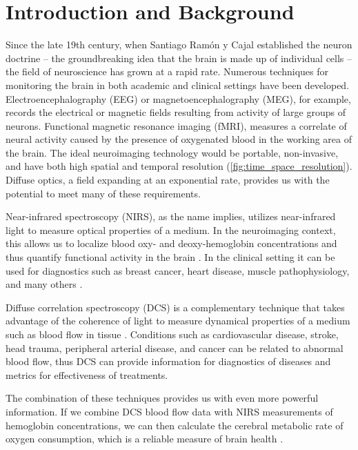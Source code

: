 \chapter{Introduction and Background} \label{sec:Chapter1}

Since the late 19th century, when Santiago Ram{\'o}n y Cajal established the neuron doctrine -- the groundbreaking idea that the brain is made up of individual cells -- the field of neuroscience has grown at a rapid rate. Numerous techniques for monitoring the brain in both academic and clinical settings have been developed. Electroencephalography (EEG) or magnetoencephalography (MEG), for example, records the electrical or magnetic fields resulting from activity of large groups of neurons. Functional magnetic resonance imaging (fMRI), measures a correlate of neural activity caused by the presence of oxygenated blood in the working area of the brain. The ideal neuroimaging technology would be portable, non-invasive, and have both high spatial and temporal resolution (\autoref{fig:time_space_resolution}). Diffuse optics, a field expanding at an exponential rate, provides us with the potential to meet many of these requirements.

Near-infrared spectroscopy (NIRS), as the name implies, utilizes near-infrared light to measure optical properties of a medium. In the neuroimaging context, this allows us to localize blood oxy- and deoxy-hemoglobin concentrations and thus quantify functional activity in the brain \cite{Boas2014}. In the clinical setting it can be used for diagnostics such as breast cancer, heart disease, muscle pathophysiology, and many others \cite{Sakudo2016}.

Diffuse correlation spectroscopy (DCS) is a complementary technique that takes advantage of the coherence of light to measure dynamical properties of a medium such as blood flow in tissue \cite{Durduran2014, Buckley2014}. Conditions such as cardiovascular disease, stroke, head trauma, peripheral arterial disease, and cancer can be related to abnormal blood flow, thus DCS can provide information for diagnostics of diseases and metrics for effectiveness of treatments.

The combination of these techniques provides us with even more powerful information. If we combine DCS blood flow data with NIRS measurements of hemoglobin concentrations, we can then calculate the cerebral metabolic rate of oxygen consumption, which is a reliable measure of brain health \cite{Durduran2010, Lin2013}.

